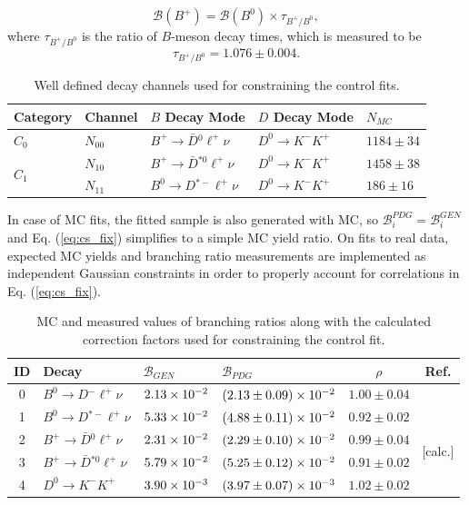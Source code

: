\begin{equation}
\mathcal{B}(B^+) = \mathcal{B}(B^0) \times \tau_{B^+/B^0},
\end{equation}
where $\tau_{B^+/B^0}$ is the ratio of $B$-meson decay times, which is measured to be \cite{Amhis:2016xyh}
\begin{equation}
\tau_{B^+/B^0} = 1.076 \pm 0.004.
\end{equation}

\begin{table}[H]
	\centering
	\begin{tabular}{l|l|l|l|l}
		Category & Channel & $B$ Decay Mode & $D$ Decay Mode & $N_{MC}$ \\
		\toprule
		$C_0$ & $N_{00}$ & $B^+ \to \bar D {}^{0} \ell^+ \nu$ & $D^0 \to K^-K^+$ & $1184 \pm 34$\\
		\midrule
		\multirow{2}{*}{$C_1$} & $N_{10}$ & $B^+ \to \bar D {}^{*0} \ell^+ \nu$ & $D^0 \to K^-K^+$ & $1458\pm38$\\
		& $N_{11}$ & $B^0 \to D {}^{*-} \ell^+ \nu$ & $D^0 \to K^-K^+$ & $186\pm16$\\
		\bottomrule
	\end{tabular}
	\captionsetup{width=0.8\linewidth}
	\caption{Well defined decay channels used for constraining the control fits.}
	\label{tab:cs_constraint_table}
\end{table}

In case of MC fits, the fitted sample is also generated with MC, so $\mathcal{B}_{i}^{PDG} = \mathcal{B}_{i}^{GEN}$ and Eq. (\ref{eq:cs_fix}) simplifies to a simple MC yield ratio. On fits to real data, expected MC yields and branching ratio measurements are implemented as independent Gaussian constraints in order to properly account for correlations in Eq. (\ref{eq:cs_fix}).
\begin{table}[H]
	\centering
	\begin{tabular}{c|l|l|l|c|c}
		ID & Decay & $\mathcal{B}_{GEN}$ & $\mathcal{B}_{PDG}$ & $\rho$ & Ref. \\
		\toprule
		0 & $B^0 \to D {}^{-} \ell^+ \nu$ & $2.13\times 10^{-2}$ & $(2.13 \pm 0.09)\times 10^{-2}$ & $1.00 \pm 0.04$ & \multirow{2}{*}{\cite{Amhis:2016xyh}} \\ 
		1 & $B^0 \to D {}^{*-} \ell^+ \nu$ & $5.33\times 10^{-2}$ & $(4.88 \pm 0.11)\times 10^{-2}$ & $0.92 \pm 0.02$ & \\
		\cline{6-6}
		2 & $B^+ \to \bar D {}^{0} \ell^+ \nu$ & $2.31\times 10^{-2}$ & $(2.29 \pm 0.10)\times 10^{-2}$ &  $0.99 \pm 0.04$ & \multirow{2}{*}{[calc.]} \\ 
		3 & $B^+ \to \bar D {}^{*0} \ell^+ \nu$ & $5.79\times 10^{-2}$ & $(5.25 \pm 0.12)\times 10^{-2}$ &  $0.91 \pm 0.02$ & \\
		\cline{6-6}
		4 & $D^0 \to K^-K^+$ & $3.90\times 10^{-3}$ & $(3.97\pm0.07)\times 10^{-3}$ & $1.02 \pm 0.02$ & \cite{tanabashi2018review} \\
		\bottomrule
	\end{tabular}
	\captionsetup{width=0.8\linewidth}
	\caption{MC and measured values of branching ratios along with the calculated correction factors used for constraining the control fit.}
	\label{tab:cs_br_constraint_table}
\end{table}

